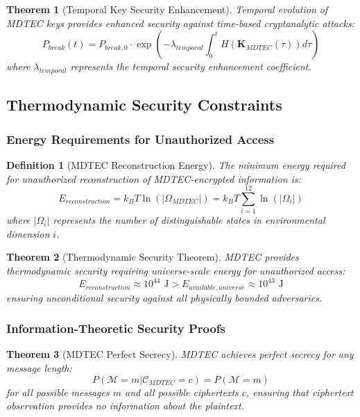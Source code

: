 \documentclass[12pt,a4paper]{article}
\newtheorem{theorem}{Theorem}
\newtheorem{definition}{Definition}
\begin{document}
\begin{theorem}[Temporal Key Security Enhancement]
Temporal evolution of MDTEC keys provides enhanced security against time-based cryptanalytic attacks:
\begin{equation}
P_{break}(t) = P_{break,0} \cdot \exp\left(-\lambda_{temporal} \int_0^t H(\mathbf{K}_{MDTEC}(\tau)) d\tau\right)
\end{equation}
where $\lambda_{temporal}$ represents the temporal security enhancement coefficient.
\end{theorem}

\subsection{Thermodynamic Security Constraints}

\subsubsection{Energy Requirements for Unauthorized Access}

\begin{definition}[MDTEC Reconstruction Energy]
The minimum energy required for unauthorized reconstruction of MDTEC-encrypted information is:
\begin{equation}
E_{reconstruction} = k_B T \ln(|\Omega_{MDTEC}|) = k_B T \sum_{i=1}^{12} \ln(|\Omega_i|)
\end{equation}
where $|\Omega_i|$ represents the number of distinguishable states in environmental dimension $i$.
\end{definition}

\begin{theorem}[Thermodynamic Security Theorem]
MDTEC provides thermodynamic security requiring universe-scale energy for unauthorized access:
\begin{equation}
E_{reconstruction} \approx 10^{44} \text{ J} > E_{available,universe} \approx 10^{43} \text{ J}
\end{equation}
ensuring unconditional security against all physically bounded adversaries.
\end{theorem}

\subsubsection{Information-Theoretic Security Proofs}

\begin{theorem}[MDTEC Perfect Secrecy]
MDTEC achieves perfect secrecy for any message length:
\begin{equation}
P(\mathcal{M} = m | \mathcal{C}_{MDTEC} = c) = P(\mathcal{M} = m)
\end{equation}
for all possible messages $m$ and all possible ciphertexts $c$, ensuring that ciphertext observation provides no information about the plaintext.
\end{theorem}
\end{document}
